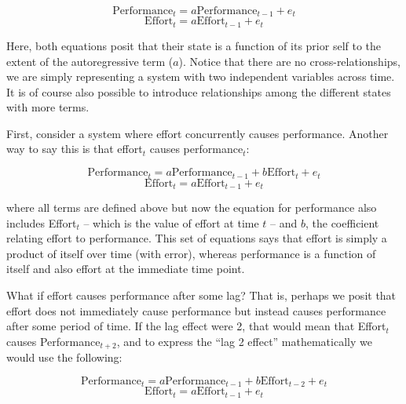 \documentclass[english,,man]{apa6}
\theoremstyle{definition}
\theoremstyle{definition}
\theoremstyle{definition}
\theoremstyle{remark}
\begin{document}
\begin{equation}
\label{sysy}
\textrm{Performance}_{t} = a \textrm{Performance}_{t - 1} + e_{t}
\end{equation} \begin{equation}
\label{sysx}
\textrm{Effort}_{t} = a \textrm{Effort}_{t - 1} + e_{t}
\end{equation}

\noindent Here, both equations posit that their state is a function of
its prior self to the extent of the autoregressive term (\(a\)). Notice
that there are no cross-relationships, we are simply representing a
system with two independent variables across time. It is of course also
possible to introduce relationships among the different states with more
terms.

First, consider a system where effort concurrently causes performance.
Another way to say this is that effort\(_t\) causes performance\(_t\):

\begin{equation}
\label{sysy2}
\textrm{Performance}_{t} = a \textrm{Performance}_{t - 1} + b \textrm{Effort}_{t} + e_{t}
\end{equation} \begin{equation}
\label{sysx2}
\textrm{Effort}_{t} = a \textrm{Effort}_{t - 1} + e_{t}
\end{equation}

\noindent where all terms are defined above but now the equation for
performance also includes Effort\(_t\) -- which is the value of effort
at time \(t\) -- and \(b\), the coefficient relating effort to
performance. This set of equations says that effort is simply a product
of itself over time (with error), whereas performance is a function of
itself and also effort at the immediate time point.

What if effort causes performance after some lag? That is, perhaps we
posit that effort does not immediately cause performance but instead
causes performance after some period of time. If the lag effect were 2,
that would mean that Effort\(_t\) causes Performance\(_{t+2}\), and to
express the \enquote{lag 2 effect} mathematically we would use the
following:

\begin{equation}
\label{sysy3}
\textrm{Performance}_{t} = a \textrm{Performance}_{t - 1} + b \textrm{Effort}_{t - 2} + e_{t}
\end{equation} \begin{equation}
\label{sysx3}
\textrm{Effort}_{t} = a \textrm{Effort}_{t - 1} + e_{t}
\end{equation}
\end{document}
